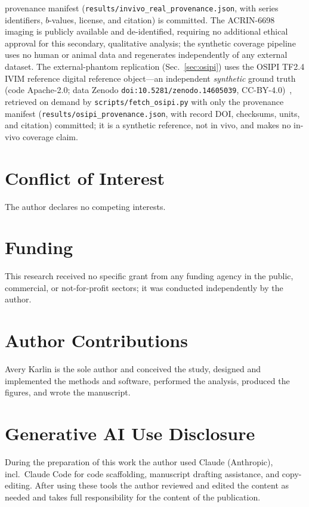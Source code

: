 \documentclass[11pt]{article}
\begin{document}
provenance manifest (\texttt{results/invivo\_real\_provenance.json}, with series
identifiers, $b$-values, license, and citation) is committed. The ACRIN-6698 imaging
is publicly available and de-identified, requiring no additional ethical approval for
this secondary, qualitative analysis; the synthetic coverage pipeline uses no human
or animal data and regenerates independently of any external dataset.
The external-phantom replication (Sec.~\ref{sec:osipi}) uses the OSIPI TF2.4 IVIM
reference digital reference object---an independent \emph{synthetic} ground truth
(code Apache-2.0; data Zenodo \texttt{doi:10.5281/zenodo.14605039},
CC-BY-4.0)~\cite{osipi_ivim}, retrieved on demand by \texttt{scripts/fetch\_osipi.py}
with only the provenance manifest (\texttt{results/osipi\_provenance.json}, with
record DOI, checksums, units, and citation) committed; it is a synthetic reference,
not in vivo, and makes no in-vivo coverage claim.

\section*{Conflict of Interest}
The author declares no competing interests.

\section*{Funding}
This research received no specific grant from any funding agency in the public,
commercial, or not-for-profit sectors; it was conducted independently by the
author.

\section*{Author Contributions}
Avery Karlin is the sole author and conceived the study, designed and implemented
the methods and software, performed the analysis, produced the figures, and wrote
the manuscript.

\section*{Generative AI Use Disclosure}
During the preparation of this work the author used Claude (Anthropic), incl.\
Claude Code for code scaffolding, manuscript drafting assistance, and copy-editing.
After using these tools the author reviewed and edited the content as needed and
takes full responsibility for the content of the publication.
\end{document}
